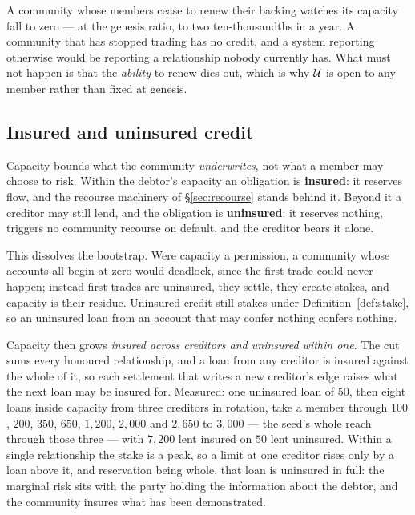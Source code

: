 \begin{remark}
\label{rem:winddown}
A community whose members cease to renew their backing watches its capacity fall to zero
--- at the genesis ratio, to two ten-thousandths in a year. A community that has stopped
trading has no credit, and a system reporting otherwise would be reporting a relationship
nobody currently has. What must not happen is that the \emph{ability} to renew dies out,
which is why $\mathcal{U}$ is open to any member rather than fixed at genesis.
\end{remark}

\subsection{Insured and uninsured credit}

Capacity bounds what the community \emph{underwrites}, not what a member may choose to
risk. Within the debtor's capacity an obligation is \textbf{insured}: it reserves flow,
and the recourse machinery of \S\ref{sec:recourse} stands behind it. Beyond it a creditor
may still lend, and the obligation is \textbf{uninsured}: it reserves nothing, triggers no
community recourse on default, and the creditor bears it alone.

This dissolves the bootstrap. Were capacity a permission, a community whose accounts all
begin at zero would deadlock, since the first trade could never happen; instead first
trades are uninsured, they settle, they create stakes, and capacity is their residue.
Uninsured credit still stakes under Definition~\ref{def:stake}, so an uninsured loan from
an account that may confer nothing confers nothing.

Capacity then grows \emph{insured across creditors and uninsured within one}. The cut sums
every honoured relationship, and a loan from any creditor is insured against the whole of
it, so each settlement that writes a new creditor's edge raises what the next loan may be
insured for. Measured: one uninsured loan of $50$, then eight loans inside capacity from
three creditors in rotation, take a member through $100$, $200$, $350$, $650$, $1{,}200$,
$2{,}000$ and $2{,}650$ to $3{,}000$ --- the seed's whole reach through those three ---
with $7{,}200$ lent insured on $50$ lent uninsured. Within a single relationship the stake
is a peak, so a limit at one creditor rises only by a loan above it, and reservation being
whole, that loan is uninsured in full: the marginal risk sits with the party holding the
information about the debtor, and the community insures what has been demonstrated.

